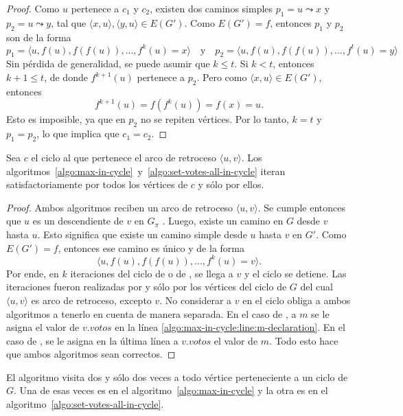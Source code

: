 \begin{proof}
    Como $u$ pertenece a $c_1$ y $c_2$, existen dos caminos simples $p_1 = u \leadsto x$ y $p_2 = u \leadsto y$, tal que $\langle x, u \rangle, \langle y, u \rangle \in E(G')$. Como $E(G') = f$, entonces $p_1$ y $p_2$ son de la forma
    $$
    p_1 = \langle u, f(u), f(f(u)), ..., f^k(u) = x \rangle \quad \text{y} \quad p_2 = \langle u, f(u), f(f(u)), ..., f^t(u) = y \rangle
    $$
    Sin p\'erdida de generalidad, se puede asumir que $k \leq t$. Si $k < t$, entonces $k+1 \leq t$, de donde $f^{k+1}(u)$ pertenece a $p_2$. Pero como $\langle x, u \rangle \in E(G')$, entonces
    $$
    f^{k+1}(u) = f(f^k(u)) = f(x) = u.
    $$
    Esto es imposible, ya que en $p_2$ no se repiten v\'ertices. Por lo tanto, $k = t$ y $p_1 = p_2$, lo que implica que $c_1 = c_2$.
\end{proof}

\begin{lemma}\label{lemma:cycle-iteration}
    Sea $c$ el ciclo al que pertenece el arco de retroceso $\langle u, v \rangle$. Los algoritmos~\ref{algo:max-in-cycle}~y~\ref{algo:set-votes-all-in-cycle} iteran satisfactoriamente por todos los v\'ertices de $c$ y s\'olo por ellos.
\end{lemma}

\begin{proof}
    Ambos algoritmos reciben un arco de retroceso $\langle u, v \rangle$. Se cumple entonces que $u$ es un descendiente de $v$ en $G_\pi$ \citep{intro-to-algo-3}. Luego, existe un camino en $G$ desde $v$ hasta $u$. Esto significa que existe  un camino simple desde $u$ hasta $v$ en $G'$. Como $E(G') = f$, entonces ese camino es \'unico y de la forma
    $$
    \langle u, f(u), f(f(u)), ..., f^k(u) = v \rangle.
    $$
    Por ende, en $k$ iteraciones del ciclo de \maxincyclecaption \;o de \setvotestoallincyclecaption, se llega a $v$ y el ciclo se detiene. Las iteraciones fueron realizadas  por y s\'olo por los v\'ertices del ciclo de $G$ del cual $\langle u, v \rangle$ es arco de retroceso, excepto $v$. No considerar a $v$ en el ciclo obliga a ambos algoritmos a tenerlo en cuenta de manera separada.  En el caso de \maxincyclecaption, a $m$ se le asigna el valor de $v.votos$ en la l\'inea \ref{algo:max-in-cycle:line:m-declaration}. En el caso de \setvotestoallincyclecaption, se le asigna en la \'ultima l\'inea a $v.votos$ el valor de $m$. Todo esto hace que ambos algoritmos sean correctos.
\end{proof}

\begin{lemma}\label{lemma:reassign-votes}
    El algoritmo \cyclevotescaption \;visita dos y s\'olo dos veces a todo v\'ertice perteneciente a un ciclo de $G$. Una de esas veces es en el algoritmo~\ref{algo:max-in-cycle} y la otra es en el algoritmo~\ref{algo:set-votes-all-in-cycle}.
\end{lemma}

